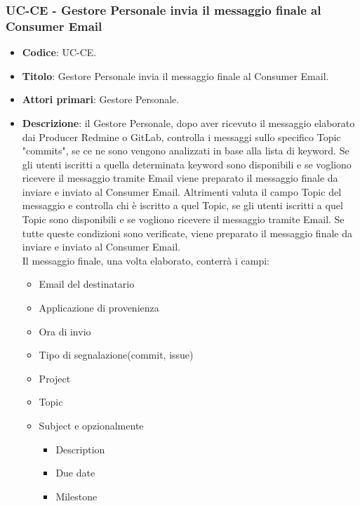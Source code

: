 \subsubsection{UC\theuccount-CE - Gestore Personale invia il messaggio finale al Consumer Email}
	\begin{itemize}
		\item \textbf{Codice}: UC\theuccount-CE.
		\item \textbf{Titolo}: Gestore Personale invia il messaggio finale al Consumer Email.
		\item \textbf{Attori primari}: Gestore Personale.
		\item \textbf{Descrizione}: il Gestore Personale, dopo aver ricevuto il messaggio elaborato dai
		Producer Redmine o GitLab, controlla i messaggi sullo specifico Topic "commits", se ce ne sono
		vengono analizzati in base alla	lista di keyword. Se gli utenti iscritti a quella determinata
		keyword sono disponibili e se vogliono ricevere il messaggio tramite Email viene preparato il
		messaggio finale da inviare e inviato al Consumer Email. Altrimenti valuta il campo Topic del
		messaggio e controlla chi è iscritto a quel Topic, se gli utenti iscritti a quel Topic sono
		disponibili e se vogliono ricevere il messaggio tramite Email. Se tutte queste condizioni sono
		verificate, viene preparato il messaggio finale da inviare e inviato al Consumer Email.\\
		Il messaggio finale, una volta elaborato, conterrà i campi:
		\begin{itemize}
			\item Email del destinatario
			\item Applicazione di provenienza
			\item Ora di invio
			\item Tipo di segnalazione(commit, issue)
			\item Project
			\item Topic
			\item Subject e opzionalmente
		 	\begin{itemize}
				\item Description
				\item Due date
				\item Milestone

\end{itemize}
\end{itemize}
\end{itemize}
